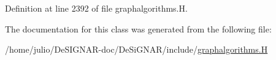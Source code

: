 Definition at line 2392 of file graphalgorithms.\+H.



The documentation for this class was generated from the following file\+:\begin{DoxyCompactItemize}
\item 
/home/julio/\+De\+S\+I\+G\+N\+A\+R-\/doc/\+De\+Si\+G\+N\+A\+R/include/\hyperlink{graphalgorithms_8_h}{graphalgorithms.\+H}\end{DoxyCompactItemize}
